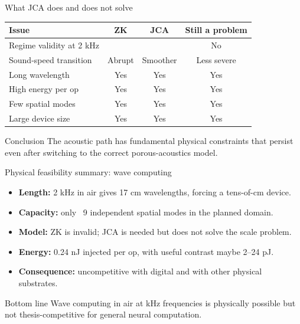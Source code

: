 \documentclass[aspectratio=169,11pt]{beamer}
\newcommand{\cmark}{\ding{51}}
\newcommand{\xmark}{\ding{55}}
\begin{document}
\begin{frame}{What JCA does and does not solve}
  \small
  \begin{center}
    \footnotesize
    \begin{tabular}{lccc}
      \toprule
      Issue & ZK & JCA & Still a problem \\
      \midrule
      Regime validity at 2 kHz & \xmark & \cmark & No \\
      Sound-speed transition & Abrupt & Smoother & Less severe \\
      Long wavelength & Yes & Yes & Yes \\
      High energy per op & Yes & Yes & Yes \\
      Few spatial modes & Yes & Yes & Yes \\
      Large device size & Yes & Yes & Yes \\
      \bottomrule
    \end{tabular}
  \end{center}

  \vspace{0.3cm}
  \begin{block}{Conclusion}
    The acoustic path has fundamental physical constraints that persist even after switching to the correct porous-acoustics model.
  \end{block}
\end{frame}

\begin{frame}{Physical feasibility summary: wave computing}
  \small
  \begin{itemize}
    \item \textbf{Length:} 2 kHz in air gives 17 cm wavelengths, forcing a tens-of-cm device.
    \item \textbf{Capacity:} only ~9 independent spatial modes in the planned domain.
    \item \textbf{Model:} ZK is invalid; JCA is needed but does not solve the scale problem.
    \item \textbf{Energy:} 0.24 nJ injected per op, with useful contrast maybe 2--24 pJ.
    \item \textbf{Consequence:} uncompetitive with digital and with other physical substrates.
  \end{itemize}

  \vspace{0.3cm}
  \begin{block}{Bottom line}
    Wave computing in air at kHz frequencies is physically possible but not thesis-competitive for general neural computation.
  \end{block}
\end{frame}
\end{document}
